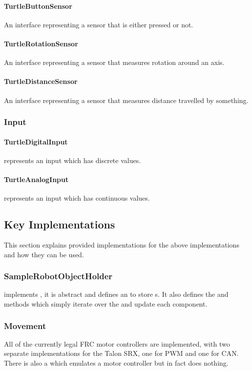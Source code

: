 \documentclass[]{report}
\begin{document}
\paragraph{TurtleButtonSensor}
An interface representing a sensor that is either pressed or not.
\paragraph{TurtleRotationSensor}
An interface representing a sensor that measures rotation around an axis.
\paragraph{TurtleDistanceSensor}
An interface representing a sensor that measures distance travelled by something.


\subsubsection{Input}
\paragraph{TurtleDigitalInput}
 represents an input which has discrete values.
\paragraph{TurtleAnalogInput}
 represents an input which has continuous values.

\subsection{Key Implementations}
This section explains provided implementations for the above implementations and how they can be used.

\subsubsection{SampleRobotObjectHolder}
 implements , it is abstract and defines an  to store s.
It also defines the  and  methods which simply iterate over the  and update each component.

\subsubsection{Movement}
All of the currently legal FRC motor controllers are implemented, with two separate implementations for the Talon SRX, one for PWM and one for CAN.
There is also a  which emulates a motor controller but in fact does nothing.
\end{document}
